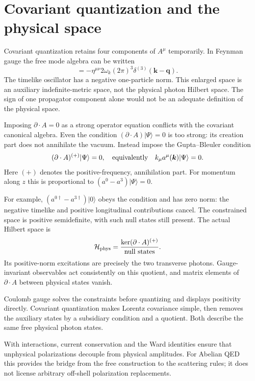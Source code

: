\documentclass[11pt]{article}
\newcommand{\vac}{\lvert0\rangle}
\newcommand{\ket}[1]{\lvert#1\rangle}
\newcommand{\module}[1]{\clearpage\section{#1}}
\newcommand{\cH}{\mathcal H}
\begin{document}
\module{Covariant quantization and the physical space}
Covariant quantization retains four components of \(A^\mu\) temporarily.
In Feynman gauge the free mode algebra can be written
\begin{equation}
 [a^\mu(\bm k),a^{\nu\dagger}(\bm q)]
 =-\eta^{\mu\nu}2\omega_k(2\pi)^3\delta^{(3)}(\bm k-\bm q).
\end{equation}
The timelike oscillator has a negative one-particle norm. This enlarged
space is an auxiliary indefinite-metric space, not the physical photon
Hilbert space. The sign of one propagator component alone would not be
an adequate definition of the physical space.

Imposing \(\partial\cdot A=0\) as a strong operator equation conflicts
with the covariant canonical algebra. Even the condition
\((\partial\cdot A)\ket{\Psi}=0\) is too strong: its creation part does
not annihilate the vacuum. Instead impose the Gupta--Bleuler condition
\begin{equation}
 (\partial\cdot A)^{(+)}\ket{\Psi}=0,
 \quad\hbox{equivalently}\quad k_\mu a^\mu(\bm k)\ket{\Psi}=0.
\end{equation}
Here \((+)\) denotes the positive-frequency, annihilation part.
For momentum along \(z\) this is proportional to
\((a^0-a^3)\ket{\Psi}=0\).

For example, \((a^{0\dagger}-a^{3\dagger})\vac\) obeys the condition
and has zero norm: the negative timelike and positive longitudinal
contributions cancel. The constrained space is positive semidefinite,
with such null states still present. The actual Hilbert space is
\begin{equation}
 \cH_{\rm phys}=
 \frac{\ker(\partial\cdot A)^{(+)}}{\text{null states}}.
\end{equation}
Its positive-norm excitations are precisely the two transverse photons.
Gauge-invariant observables act consistently on this quotient, and matrix
elements of \(\partial\cdot A\) between physical states vanish.

\begin{keyidea}
Coulomb gauge solves the constraints before quantizing and displays
positivity directly. Covariant quantization makes Lorentz covariance
simple, then removes the auxiliary states by a subsidiary condition and
a quotient. Both describe the same free physical photon states.
\end{keyidea}
With interactions, current conservation and the Ward identities ensure
that unphysical polarizations decouple from physical amplitudes.
For Abelian QED this provides the bridge from the free construction to
the scattering rules; it does not license arbitrary off-shell
polarization replacements.
\end{document}
